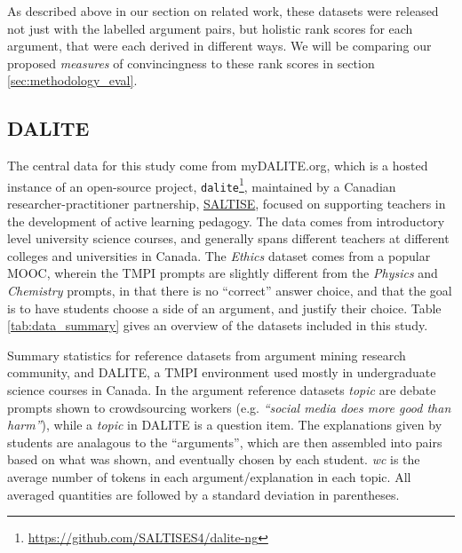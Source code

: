 \documentclass[notitlepage,12pt]{jedm}
\begin{document}
As described above in our section on related work, these datasets were released 
not just with the labelled argument pairs, but holistic rank scores for each 
argument, that were each derived in different ways. 
We will be comparing our proposed \textit{measures} of convincingness to these 
rank scores in section \ref{sec:methodology_eval}.


\subsection{DALITE}\label{sec:dataset_dalite}
The central data for this study come from myDALITE.org, which is a hosted 
instance of an open-source project, 
\verb|dalite|\footnote{\url{https://github.com/SALTISES4/dalite-ng}}, 
maintained by a Canadian researcher-practitioner partnership, 
\href{saltise.ca}{SALTISE}, focused on supporting teachers in the development 
of active learning pedagogy.
The data comes from introductory level university science courses, and 
generally spans different teachers at different colleges and universities in 
Canada. 
The \textit{Ethics} dataset comes from a popular MOOC, wherein the TMPI prompts 
are slightly different from the \textit{Physics} and \textit{Chemistry} 
prompts, in that there is no ``correct'' answer choice, and that the goal is to 
have students choose a side of an argument, and justify their choice.
Table \ref{tab:data_summary} gives an overview of the datasets included in this 
study.


\begin{table}
	
	\caption{
		Summary statistics for reference datasets from argument mining research 
		community, and DALITE, a TMPI environment used mostly in undergraduate 
		science courses in Canada. 
		In the argument reference datasets \textit{topic} are debate prompts 
		shown to crowdsourcing workers (e.g. \textit{``social media does more 
		good than harm''}), while a \textit{topic} in DALITE is a question item.
		The explanations given by students are analagous to the ``arguments'',  
		which are then assembled into pairs based on what was shown, and 
		eventually chosen by each student.
		\textit{wc} is the average number of tokens in each 
		argument/explanation in each topic.
		All averaged quantities are followed by a standard deviation in 
		parentheses.
	}
	\label{tab:data_summary}
\end{table}
\end{document}
